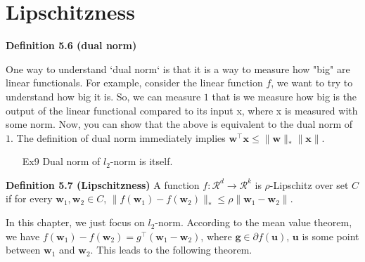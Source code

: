 \documentclass{article}
\begin{document}
\section{Lipschitzness}

	\textbf{Definition 5.6 (dual norm)}
	
	
	One way to understand `dual norm` is that it is a way to measure how "big" are linear functionals. For example, consider the linear function $f$, we want to try to understand how big it is. So, we can measure $1$ that is we measure how big is the output of the linear functional compared to its input x, where x is measured with some norm. Now, you can show that the above is equivalent to the dual norm of $1$. The definition of dual norm immediately implies $\mathbf{w}^\top \mathbf{x}\leq \|\mathbf{w}\|_* \|\mathbf{x}\|$.
	
	\begin{itemize}
	\item[Ex9] Dual norm of $l_2$-norm is itself.
	\end{itemize}
	

	\textbf{Definition 5.7 (Lipschitzness)} A function $f: \mathcal{R}^d\rightarrow \mathcal{R}^k$ is $\rho$-Lipschitz over set $C$ if for every $\mathbf{w}_1, \mathbf{w}_2 \in C$, $\|f(\mathbf{w}_1) - f(\mathbf{w}_2)\|_* \leq \rho \|\mathbf{w}_1 - \mathbf{w}_2\|$. 
	
	In this chapter, we just focus on $l_2$-norm. According to the mean value theorem, we have $f(\mathbf{w}_1)-f(\mathbf{w}_2)=g^\top (\mathbf{w}_1-\mathbf{w}_2)$, where $\mathbf{g}\in\partial f(\mathbf{u})$, $\mathbf{u}$ is some point between $\mathbf{w}_1$ and $\mathbf{w}_2$. This leads to the following theorem.
 	
\end{document}
